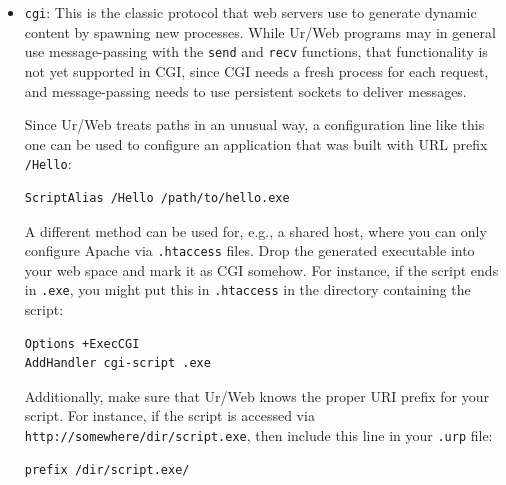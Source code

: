 \documentclass{article}
\begin{document}
\begin{itemize}
\begin{itemize}
    Each error line the server prints on stderr begins with what it was doing: the method and path of a request, a periodic task by where it is declared, the expunging of a client, or start-up.  The other protocols print theirs the same way.

    With \texttt{-k} the server keeps a connection open for further requests, and closes it after \texttt{-T} seconds without input, 5 by default.  Behind a proxy that keeps its own connections to the server open, as nginx does with \texttt{keepalive} in its \texttt{upstream}, set the proxy's idle limit below that: nginx's \texttt{keepalive\_timeout}, which is 60 seconds by default.  Otherwise the server can close a connection just as the proxy sends a request on it, and nginx answers such a request with a 502 when it is not idempotent, as a POST is not.
  \item \texttt{cgi}: This is the classic protocol that web servers use to generate dynamic content by spawning new processes.  While Ur/Web programs may in general use message-passing with the \texttt{send} and \texttt{recv} functions, that functionality is not yet supported in CGI, since CGI needs a fresh process for each request, and message-passing needs to use persistent sockets to deliver messages.

    Since Ur/Web treats paths in an unusual way, a configuration line like this one can be used to configure an application that was built with URL prefix \texttt{/Hello}:
    \begin{verbatim}
ScriptAlias /Hello /path/to/hello.exe
    \end{verbatim}

    A different method can be used for, e.g., a shared host, where you can only configure Apache via \texttt{.htaccess} files.  Drop the generated executable into your web space and mark it as CGI somehow.  For instance, if the script ends in \texttt{.exe}, you might put this in \texttt{.htaccess} in the directory containing the script:
    \begin{verbatim}
Options +ExecCGI
AddHandler cgi-script .exe
    \end{verbatim}

    Additionally, make sure that Ur/Web knows the proper URI prefix for your script.  For instance, if the script is accessed via \texttt{http://somewhere/dir/script.exe}, then include this line in your \texttt{.urp} file:
    \begin{verbatim}
prefix /dir/script.exe/
    \end{verbatim}


\end{itemize}
\end{itemize}
\end{document}
